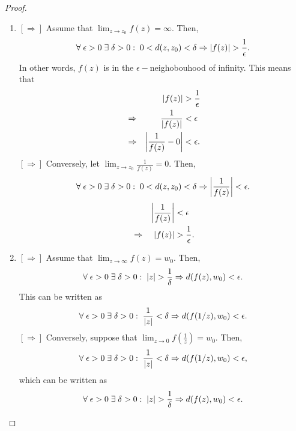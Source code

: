 \documentclass[12pt]{book}
\begin{document}
\begin{proof}
    \begin{enumerate}[label = {(\roman*)}]
        \item
            $\mathbf{[\Rightarrow]}$ Assume that $\lim_{z \rightarrow z_0} f(z) = \infty.$ Then,
            $$
                \forall\; \epsilon > 0\; \exists\; \delta > 0: \; 0 < d(z, z_0) < \delta \Rightarrow \left\lvert f(z) \right\rvert > \frac{1}{\epsilon}.
            $$
            In other words, $f(z)$ is in the $\epsilon-$neighobouhood of infinity. This means that 
            \begin{align*}
                &&\left\lvert f(z) \right\rvert 
                    &> 
                        \frac{1}{\epsilon} \\
                &\Rightarrow &\frac{1}{\left\lvert f(z) \right\rvert}
                    &<
                        \epsilon \\
                &\Rightarrow &\left\lvert \frac{1}{f(z)} - 0 \right\rvert
                    &<
                        \epsilon.
            \end{align*}
            $\mathbf{[\Rightarrow]}$ Conversely, let $\lim_{z \rightarrow z_0} \frac{1}{f(z)} = 0.$ Then,
            $$
                \forall\; \epsilon > 0\; \exists\; \delta > 0: \; 0 < d(z, z_0) < \delta \Rightarrow \left\lvert \frac{1}{f(z)} \right\rvert < \epsilon.
            $$
            \begin{align*}
                &&\left\lvert \frac{1}{f(z)} \right\rvert
                    &< 
                        \epsilon \\
                &\Rightarrow &\left\lvert f(z) \right\rvert
                    &>
                        \frac{1}{\epsilon}.
            \end{align*}
        \item
            $\mathbf{[\Rightarrow]}$ Assume that $\lim_{z \rightarrow \infty} f(z) = w_0.$ Then,
            $$
                \forall\; \epsilon > 0\; \exists\; \delta > 0: \; \left\lvert z \right\rvert > \frac{1}{\delta} \Rightarrow d(f(z), w_0) < \epsilon.
            $$
            This can be written as
            $$
                \forall\; \epsilon > 0\; \exists\; \delta > 0: \; \frac{1}{\left\lvert z \right\rvert} < \delta \Rightarrow d(f(1/z), w_0) < \epsilon.
            $$
            $\mathbf{[\Rightarrow]}$ Conversely, suppose that $\lim_{z \rightarrow 0} f\left(\frac{1}{z}\right) = w_0.$ Then, 
            $$
                \forall\; \epsilon > 0\; \exists\; \delta > 0: \; \frac{1}{\left\lvert z \right\rvert} < \delta \Rightarrow d(f(1/z), w_0) < \epsilon,
            $$
            which can be written as
            $$
                \forall\; \epsilon > 0\; \exists\; \delta > 0: \; \left\lvert z \right\rvert > \frac{1}{\delta} \Rightarrow d(f(z), w_0) < \epsilon.
$$
\end{enumerate}
\end{proof}
\end{document}
